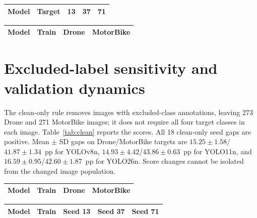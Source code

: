 \documentclass[10pt,a4paper]{article}
\begin{document}
\noindent\begin{minipage}[t]{0.48\textwidth}
\label{tab:seedgaps}\centering\small
\setlength{\tabcolsep}{4pt}
\begin{tabular}{llrrr}\toprule
Model & Target & 13 & 37 & 71\\\midrule

\end{tabular}
\end{minipage}\hfill
\begin{minipage}[t]{0.49\textwidth}
\label{tab:map50}\centering\small
\setlength{\tabcolsep}{3pt}
\begin{tabular}{llrr}\toprule
Model & Train & Drone & MotorBike\\\midrule

\end{tabular}
\end{minipage}

\newpage
\section*{Excluded-label sensitivity and validation dynamics}
The clean-only rule removes images with excluded-class annotations, leaving 273 Drone and 271 MotorBike images; it does not require all four target classes in each image. Table~\ref{tab:clean} reports the scores. All 18 clean-only seed gaps are positive. Mean $\pm$ SD gaps on Drone/MotorBike targets are $15.25\pm1.58$/$41.87\pm1.34$~pp for YOLOv8n, $14.93\pm4.42$/$43.86\pm0.63$~pp for YOLO11n, and $16.59\pm0.95$/$42.60\pm1.87$~pp for YOLO26n. Score changes cannot be isolated from the changed image population.

\noindent\begin{minipage}[t]{0.49\textwidth}
\label{tab:clean}\centering\small
\setlength{\tabcolsep}{3pt}
\begin{tabular}{llrr}\toprule
Model & Train & Drone & MotorBike\\\midrule

\end{tabular}
\end{minipage}\hfill
\begin{minipage}[t]{0.48\textwidth}
\label{tab:peaks}\centering\small
\setlength{\tabcolsep}{4pt}
\begin{tabular}{llrrr}\toprule
Model & Train & Seed 13 & Seed 37 & Seed 71\\\midrule

\end{tabular}
\end{minipage}
\end{document}
